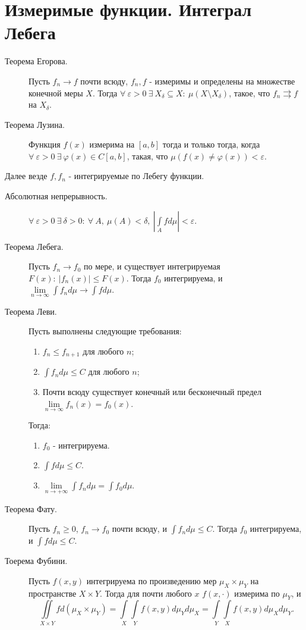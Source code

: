 \documentclass[a4paper,12pt]{scrartcl}
\begin{document}
\section{Измеримые функции. Интеграл Лебега}
\begin{description}
 \item[Теорема Егорова.] Пусть $f_n \to f$ почти всюду, $f_n,f$ - измеримы и определены на множестве конечной меры $X$. Тогда $\forall\ \varepsilon >0\ \exists\ X_\delta \subseteq X:\ \mu(X\setminus X_\delta)$, такое, что $f_n\rightrightarrows f$ на $X_\delta$.
 \item[Теорема Лузина.] Функция $f(x)$ измерима на $[a,b]$ тогда и только тогда, когда $\forall\ \varepsilon >0\ \exists\ \varphi(x)\in C[a,b]$, такая, что $\mu(f(x) \neq \varphi(x)) < \varepsilon$.
\end{description}
Далее везде $f,f_n$ - интегрируемые по Лебегу функции.
\begin{description} 
\item[Абсолютная непрерывность.] $\forall\ \varepsilon >0\ \exists\ \delta>0:\ \forall\ A,\ \mu(A)< \delta,\  \left|\int\limits_A fd\mu\right| < \varepsilon$.
 \item[Теорема Лебега.] Пусть $f_n\to f_0$ по мере, и существует интегрируемая $F(x):\ |f_n(x)| \leqslant F(x)$. Тогда $f_0$ интегрируема, и $\lim\limits_{n\to\infty}\int f_nd\mu\to\int fd\mu$.
 \item[Теорема Леви.] Пусть выполнены следующие требования:
 \begin{enumerate}
  \item $f_n \leqslant f_{n+1}$ для любого $n$;
  \item $\int f_n d\mu \leqslant C$ для любого $n$;
  \item Почти всюду существует конечный или бесконечный предел $\lim\limits_{n\to\infty}f_n(x) = f_0(x)$.
 \end{enumerate}
Тогда:
\begin{enumerate}
 \item $f_0$ - интегрируема.
 \item $\int f d\mu \leqslant C$.
 \item $\lim\limits_{n\to+\infty}\int f_nd\mu = \int f_0 d\mu$.
\end{enumerate}
 \item[Теорема Фату.] Пусть $f_n \geqslant 0$, $f_n\to f_0$ почти всюду, и $\int f_n d\mu \leqslant C$. Тогда $f_0$ интегрируема, и $\int fd\mu \leqslant C$.
 \item[Тоерема Фубини.] Пусть $f(x,y)$ интегрируема по произведению мер $\mu_X\times\mu_Y$ на пространстве $X\times Y$. Тогда для почти любого $x$ $f(x,\cdot)$ измерима по $\mu_Y$, и
$$
\iint\limits_{X\times Y} f d (\mu_X\times\mu_Y) = \int\limits_X\int\limits_Y f(x,y) d\mu_Y d\mu_X = \int\limits_Y\int\limits_X f(x,y) d\mu_X d\mu_Y.
$$
\end{description}
\end{document}
